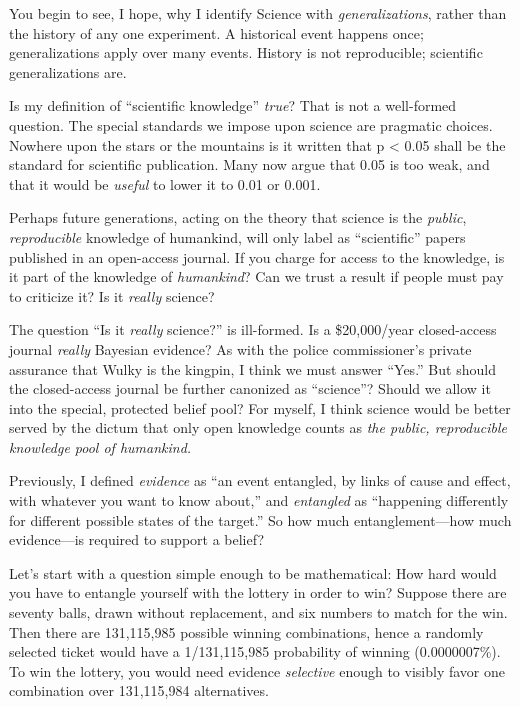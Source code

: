 {
 You begin to see, I hope, why I identify Science with
\textit{generalizations}, rather than the history of any one
experiment. A historical event happens once; generalizations apply over
many events. History is not reproducible; scientific generalizations
are.}

{
 Is my definition of ``scientific
knowledge'' \textit{true}? That is not a well-formed
question. The special standards we impose upon science are pragmatic
choices. Nowhere upon the stars or the mountains is it written that p
{\textless} 0.05 shall be the standard for scientific publication. Many
now argue that 0.05 is too weak, and that it would be \textit{useful}
to lower it to 0.01 or 0.001.}

{
 Perhaps future generations, acting on the theory that science is
the \textit{public}, \textit{reproducible} knowledge of humankind, will
only label as ``scientific'' papers
published in an open-access journal. If you charge for access to the
knowledge, is it part of the knowledge of \textit{humankind}? Can we
trust a result if people must pay to criticize it? Is it
\textit{really} science?}

{
 The question ``Is it \textit{really}
science?'' is ill-formed. Is a \$20,000/year
closed-access journal \textit{really} Bayesian evidence? As with the
police commissioner's private assurance that Wulky is
the kingpin, I think we must answer
``Yes.'' But should the
closed-access journal be further canonized as
``science''? Should we allow it into
the special, protected belief pool? For myself, I think science would
be better served by the dictum that only open knowledge counts as
\textit{the public, reproducible knowledge pool of humankind.}}

\myendsectiontext




{
 Previously, I defined \textit{evidence} as ``an
event entangled, by links of cause and effect, with whatever you want
to know about,'' and \textit{entangled} as
``happening differently for different possible states
of the target.'' So how much entanglement---how much
evidence---is required to support a belief? }

{
 Let's start with a question simple enough to be
mathematical: How hard would you have to entangle yourself with the
lottery in order to win? Suppose there are seventy balls, drawn without
replacement, and six numbers to match for the win. Then there are
131,115,985 possible winning combinations, hence a randomly selected
ticket would have a 1/131,115,985 probability of winning (0.0000007\%).
To win the lottery, you would need evidence \textit{selective} enough
to visibly favor one combination over 131,115,984 alternatives.}

